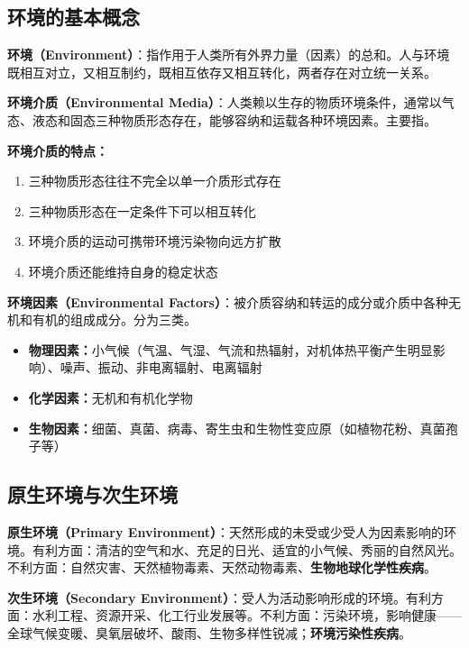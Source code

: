 \subsection{环境的基本概念}

\begin{defbox}
\textbf{环境（Environment）}：指作用于人类所有外界力量（因素）的总和。人与环境既相互对立，又相互制约，既相互依存又相互转化，两者存在对立统一关系。
\end{defbox}

\begin{defbox}
\textbf{环境介质（Environmental Media）}：人类赖以生存的物质环境条件，通常以气态、液态和固态三种物质形态存在，能够容纳和运载各种环境因素。主要指。
\end{defbox}

\textbf{环境介质的特点：}
\begin{enumerate}[leftmargin=*]
    \item 三种物质形态往往不完全以单一介质形式存在
    \item 三种物质形态在一定条件下可以相互转化
    \item 环境介质的运动可携带环境污染物向远方扩散
    \item 环境介质还能维持自身的稳定状态
\end{enumerate}

\begin{defbox}
\textbf{环境因素（Environmental Factors）}：被介质容纳和转运的成分或介质中各种无机和有机的组成成分。分为三类。

\begin{itemize}[leftmargin=*]
    \item \textbf{物理因素：}小气候（气温、气湿、气流和热辐射，对机体热平衡产生明显影响）、噪声、振动、非电离辐射、电离辐射
    \item \textbf{化学因素：}无机和有机化学物
    \item \textbf{生物因素：}细菌、真菌、病毒、寄生虫和生物性变应原（如植物花粉、真菌孢子等）
\end{itemize}
\end{defbox}

\subsection{原生环境与次生环境}

\begin{defbox}
\textbf{原生环境（Primary Environment）}：天然形成的未受或少受人为因素影响的环境。有利方面：清洁的空气和水、充足的日光、适宜的小气候、秀丽的自然风光。不利方面：自然灾害、天然植物毒素、天然动物毒素、\textbf{生物地球化学性疾病}。

\textbf{次生环境（Secondary Environment）}：受人为活动影响形成的环境。有利方面：水利工程、资源开采、化工行业发展等。不利方面：污染环境，影响健康——全球气候变暖、臭氧层破坏、酸雨、生物多样性锐减；\textbf{环境污染性疾病}。
\end{defbox}


